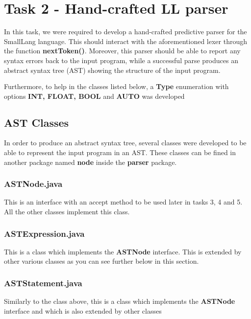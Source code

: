 \documentclass{article}
\begin{document}
					
					\section{Task 2 - Hand-crafted LL parser}
					
					In this task, we were required to develop a hand-crafted predictive parser for the SmallLang language. This should interact with the aforementioned lexer through the function \textbf{nextToken()}. Moreover, this parser should be able to report any syntax errors back to the input program, while a successful parse produces an abstract syntax tree (AST) showing the structure of the input program.
					
			\noindent Furthermore, to help in the classes listed below, a \textbf{Type} enumeration with options \textbf{INT, FLOAT, BOOL} and \textbf{AUTO} was developed
					
					\subsection{AST Classes}
					
					In order to produce an abstract syntax tree, several classes were developed to be able to represent the input program in an AST. These classes can be fined in another package named \textbf{node} inside the \textbf{parser} package.
					
					\subsubsection{ASTNode.java}
					
					This is an interface with an accept method to be used later in tasks 3, 4 and 5. All the other classes implement this class.
					
					\subsubsection{ASTExpression.java}
					
					This is a class which implements the \textbf{ASTNode} interface. This is extended by other various classes as you can see further below in this section.
					
					\subsubsection{ASTStatement.java}
					
					Similarly to the class above, this is a class which implements the \textbf{ASTNode} interface and which is also extended by other classes
					
\end{document}

